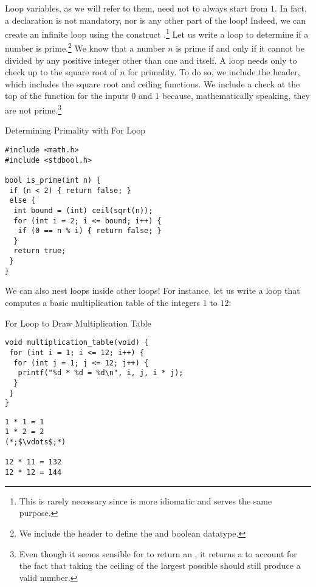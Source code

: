Loop variables, as we will refer to them, need not to always start from $1$. In fact, a declaration is not mandatory, nor is any other part of the loop! Indeed, we can create an infinite \for loop using the construct \for{ (;;)}.\footnote{This is rarely necessary since \while{} is more idiomatic and serves the same purpose.} Let us write a \for loop to determine if a number is prime.\footnote{We include the  header to define the  and  boolean datatype.} We know that a number $n$ is prime if and only if it cannot be divided by any positive integer other than one and itself. A \for loop needs only to check up to the square root of $n$ for primality. To do so, we include the  header, which includes the square root and ceiling functions. We include a check at the top of the function for the inputs $0$ and $1$ because, mathematically speaking, they are not prime.\footnote{Even though it seems sensible for  to return an , it returns a  to account for the fact that taking the ceiling of the largest possible  should still produce a valid number.}

\begin{cl}[main.c]{Determining Primality with For Loop}
\begin{lstlisting}[language=MyC]
#include <math.h>
#include <stdbool.h>

bool is_prime(int n) {
 if (n < 2) { return false; }
 else {
  int bound = (int) ceil(sqrt(n));
  for (int i = 2; i <= bound; i++) {
   if (0 == n % i) { return false; }
  }
  return true;
 }
}
\end{lstlisting}
\end{cl}

We can also nest loops inside other loops! For instance, let us write a loop that computes a basic multiplication table of the integers $1$ to $12$:

\begin{clo}[main.c]{For Loop to Draw Multiplication Table}
\begin{lstlisting}[language=MyC]
void multiplication_table(void) {
 for (int i = 1; i <= 12; i++) {
  for (int j = 1; j <= 12; j++) {
   printf("%d * %d = %d\n", i, j, i * j);
  }
 }
}
\end{lstlisting}
\tcblower
\begin{lstlisting}[language=MyOutput]
1 * 1 = 1
1 * 2 = 2
(*;$\vdots$;*)

12 * 11 = 132
12 * 12 = 144
\end{lstlisting}
\end{clo}

